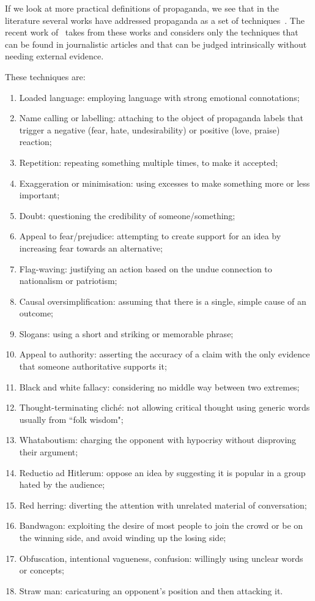 If we look at more practical definitions of propaganda, we see that in the literature several works have addressed propaganda as a set of techniques~\citep{torok2015symbiotic,miller1939techniques,weston2018rulebook}. The recent work of~\citet{da2019fine} takes from these works and considers only the techniques that can be found in journalistic articles and that can be judged intrinsically without needing external evidence.

These techniques are:
\begin{enumerate}
    \item Loaded language: employing language with strong emotional connotations;
    \item Name calling or labelling: attaching to the object of propaganda labels that trigger a negative (fear, hate, undesirability) or positive (love, praise) reaction;
    \item Repetition: repeating something multiple times, to make it accepted;
    \item Exaggeration or minimisation: using excesses to make something more or less important;
    \item Doubt: questioning the credibility of someone/something;
    \item Appeal to fear/prejudice: attempting to create support for an idea by increasing fear towards an alternative;
    \item Flag-waving: justifying an action based on the undue connection to nationalism or patriotism;
    \item Causal oversimplification: assuming that there is a single, simple cause of an outcome;
    \item Slogans: using a short and striking or memorable phrase;
    \item Appeal to authority: asserting the accuracy of a claim with the only evidence that someone authoritative supports it;
    \item Black and white fallacy: considering no middle way between two extremes;
    \item Thought-terminating cliché: not allowing critical thought using generic words usually from ``folk wisdom";
    \item Whataboutism: charging the opponent with hypocrisy without disproving their argument;
    \item Reductio ad Hitlerum: oppose an idea by suggesting it is popular in a group hated by the audience;
    \item Red herring: diverting the attention with unrelated material of conversation;
    \item Bandwagon: exploiting the desire of most people to join the crowd or be on the winning side, and avoid winding up the losing side;
    \item Obfuscation, intentional vagueness, confusion: willingly using unclear words or concepts; 
    \item Straw man: caricaturing an opponent's position and then attacking it.
\end{enumerate}


